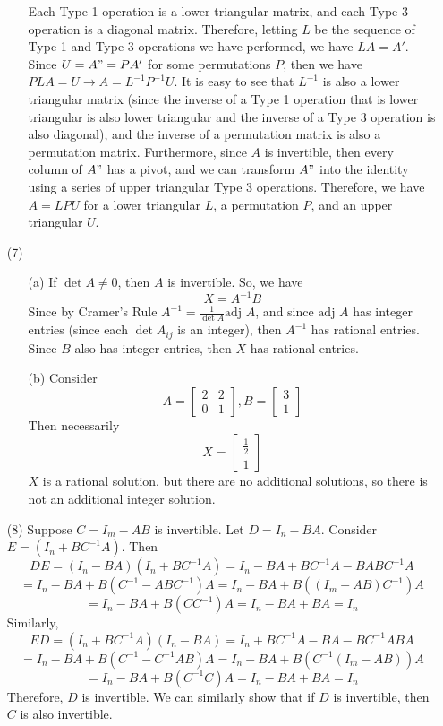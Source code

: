\begin{itemize}
\begin{itemize}
Each Type 1 operation is a lower triangular matrix, and each Type 3 operation is a diagonal matrix. Therefore, letting $L$ be the sequence of Type 1 and Type 3 operations we have performed, we have $LA = A'$. Since $U = A" = PA'$ for some permutations $P$, then we have $PLA = U \rightarrow A = L^{-1}P^{-1}U$. It is easy to see that $L^{-1}$ is also a lower triangular matrix (since the inverse of a Type 1 operation that is lower triangular is also lower triangular and the inverse of a Type 3 operation is also diagonal), and the inverse of a permutation matrix is also a permutation matrix. Furthermore, since $A$ is invertible, then every column of $A"$ has a pivot, and we can transform $A"$ into the identity using a series of upper triangular Type 3 operations. Therefore, we have $A = LPU$ for a lower triangular $L$, a permutation $P$, and an upper triangular $U$.
\end{itemize}
\item[(7)]
\begin{itemize}
\item[(a)]
If $\det A \neq 0$, then $A$ is invertible. So, we have
$$X = A^{-1}B$$
Since by Cramer's Rule $A^{-1} = \frac{1}{\det A}\text{adj }A$, and since $\text{adj }A$ has integer entries (since each $\det A_{ij}$ is an integer), then $A^{-1}$ has rational entries. Since $B$ also has integer entries, then $X$ has rational entries.
\item[(b)]
Consider
$$A = \begin{bmatrix}
2 & 2 \\
0 & 1
\end{bmatrix}, B = \begin{bmatrix}
3 \\
1
\end{bmatrix}$$
Then necessarily
$$X = \begin{bmatrix}
\frac{1}{2} \\
1
\end{bmatrix}$$
$X$ is a rational solution, but there are no additional solutions, so there is not an additional integer solution.
\end{itemize}
\item[(8)]
Suppose $C = I_m - AB$ is invertible. Let $D = I_n - BA$. Consider $E = (I_n + BC^{-1}A)$. Then
$$DE = (I_n - BA)(I_n + BC^{-1}A) = I_n - BA + BC^{-1}A - BABC^{-1}A$$
$$= I_n - BA + B(C^{-1} - ABC^{-1})A = I_n - BA + B((I_m - AB)C^{-1})A$$
$$= I_n - BA + B(CC^{-1})A = I_n - BA + BA = I_n$$
Similarly,
$$ED = (I_n + BC^{-1}A)(I_n - BA) = I_n + BC^{-1}A - BA - BC^{-1}ABA$$
$$= I_n - BA + B(C^{-1} - C^{-1}AB)A = I_n - BA + B(C^{-1}(I_m - AB))A$$
$$= I_n - BA + B(C^{-1}C)A = I_n - BA + BA = I_n$$
Therefore, $D$ is invertible. We can similarly show that if $D$ is invertible, then $C$ is also invertible.
\end{itemize}